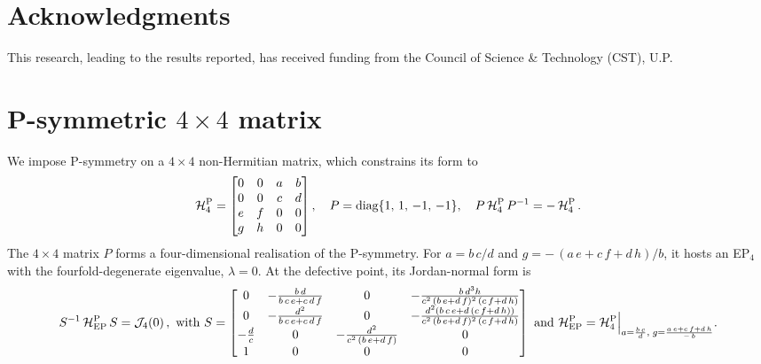 \documentclass[aps, prb, onecolumn, nofootinbib, citeautoscript, 10pt]{revtex4-2}
\begin{document}
\section*{Acknowledgments}

This research, leading to the results reported, has received funding from the Council of Science \& Technology (CST), U.P.


\appendix

\section{P-symmetric $4 \times 4$ matrix}
\label{app1}

We impose P-symmetry on a $4\times 4$ non-Hermitian matrix, which constrains its form to \cite{ips-emil}
\begin{align}
\mathcal H^{\rm P}_4 = \begin{bmatrix}
 0 & 0 & a & b \\
 0 & 0 & c & d \\
 e & f & 0 & 0 \\
 g & h & 0 & 0 \\
\end{bmatrix}, \quad
P = \text{diag}\lbrace 1,\,1,\,-1,\,-1 \rbrace ,\quad
P\,\mathcal H^{\rm P}_4\, P^{-1} = - \, \mathcal H^{\rm P}_4 \,.
\end{align}
The $4 \times 4 $ matrix $P$ forms a four-dimensional realisation of the P-symmetry. 
For $ a = b\, c/d $ and $ g= -\, (a \,e+c\, f+d\, h)/b $, it hosts an EP$_4$ with the fourfold-degenerate eigenvalue, $\lambda = 0$. At the defective point, its Jordan-normal form is
\begin{align}
S^{-1} \, {\mathcal H^{\rm P}_{\rm EP}} \, S = \mathcal J_4(0)\,, \text{ with }
S = \begin{bmatrix}
0 & -\frac{ b\, d}{b \,c\, e+c\, d\, f} & 0 & -\frac{ b\, d^3 h}{c^2 \, (b \,e+d\, f)^2 \, (c\, f+d \,h)} \\
 0 & -\frac{d^2}{b \,c\, e+c\, d\, f} & 0 & -\frac{d^2 (b \,c\, e +d \, (c\, f+d \,h))}{c^2 \, (b \,e+d\, f)^2 \, (c\, f+d \,h)} \\
 -\frac{d}{c} & 0 & -\frac{d^2}{c^2 \, (b \,e+d\, f)} & 0 \\
 1 & 0 & 0 & 0
\end{bmatrix} 
\text{ and }
{\mathcal H^{\rm P}_{\rm EP}}  = {\mathcal H^{\rm P}_4} \Big \vert_{a = \frac{b\, c} {d},\; g= \frac{a \,e+c\, f+d\, h}{ -\,b}}.
\end{align}
\end{document}
